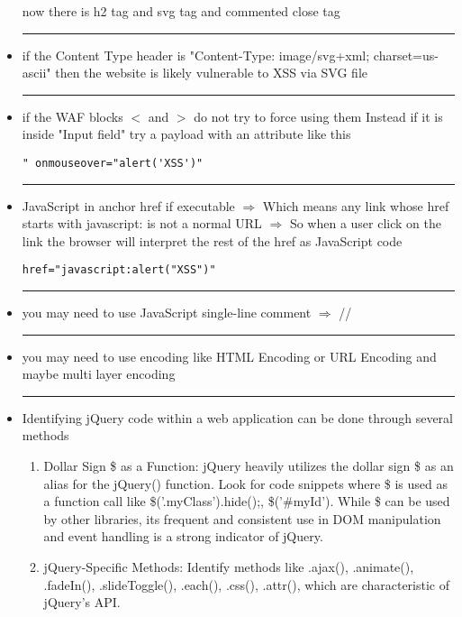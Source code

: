 \documentclass{article}
\begin{document}
\begin{itemize}
          now there is h2 tag and svg tag and commented close tag\\
    \rule{5cm}{0.4pt}
    \item if the Content Type header is "Content-Type: image/svg+xml; charset=us-ascii"
          then the website is likely vulnerable to XSS via SVG file\\
          \rule{5cm}{0.4pt}
    \item if the WAF blocks $<$ and $>$ do not try to force using them Instead if it is
          inside "Input field" try a payload with an attribute like this
          \begin{lstlisting}[frame=single]
                    " onmouseover="alert('XSS')"
            \end{lstlisting}
            \rule{5cm}{0.4pt}
    \item JavaScript in anchor href if executable $\Longrightarrow$ Which means any link
          whose href starts with javascript: is not a normal URL $\Longrightarrow$ So
          when a user click on the link the browser will interpret the rest of the href
          as JavaScript code
          \begin{lstlisting}[frame=single]
                    href="javascript:alert("XSS")"
            \end{lstlisting}
            \rule{5cm}{0.4pt}
    \item you may need to use JavaScript single-line comment $\Longrightarrow$ //
    \\ \rule{5cm}{0.4pt}
    \item you may need to use encoding like HTML Encoding or URL Encoding and maybe multi layer encoding \\
    \rule{5cm}{0.4pt}
      \item Identifying jQuery code within a web application can be done through several methods
      \begin {enumerate}
      \item Dollar Sign \$ as a Function: jQuery heavily utilizes the dollar sign \$ as an alias for the jQuery() function. Look for code snippets where \$ is used as a function call like \$('.myClass').hide();, \$('\#myId'). While \$ can be used by other libraries, its frequent and consistent use in DOM manipulation and event handling is a strong indicator of jQuery.
      \item  jQuery-Specific Methods: Identify methods like .ajax(), .animate(), .fadeIn(), .slideToggle(), .each(), .css(), .attr(), which are characteristic of jQuery's API.

\end{enumerate}
\end{itemize}
\end{document}
